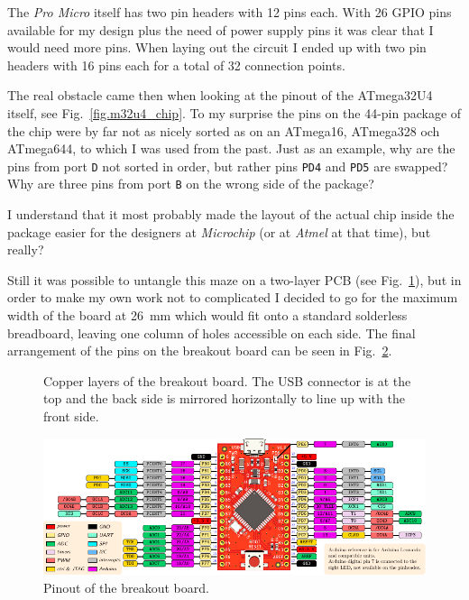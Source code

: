 \begin{multicols}{2}
The \emph{Pro Micro} itself has two pin headers with 12 pins each. With 26 GPIO pins available
for my design plus the need of power supply pins it was clear that I would need more pins.
When laying out the circuit I ended up with two pin headers with 16 pins each for a total
of 32 connection points.

The real obstacle came then when looking at the pinout of the ATmega32U4 itself, see Fig.~\ref{fig.m32u4_chip}.
To my surprise
the pins on the 44-pin package of the chip were by far not as nicely sorted as
on an ATmega16, ATmega328 och ATmega644, to which I was used from the past. Just as an example,
why are the pins from port \lstinline!D! not sorted in order, but rather pins \lstinline!PD4! and \lstinline!PD5!
 are swapped? Why are
three pins from port \lstinline!B! on the wrong side of the package?

I understand that it most probably made the layout of the actual chip inside the package easier
for the designers at \emph{Microchip} (or at \emph{Atmel} at that time), but really?

Still it was possible to untangle this maze on a two-layer PCB (see Fig.~\ref{fig.m32u4_board}), but in order to make my own work
not to complicated I decided to go for the maximum width of the board at \SI{26}{\milli\metre} which would fit onto a
standard solderless breadboard, leaving one column of holes accessible on each side. The final arrangement of the pins on the
breakout board can be seen in Fig.~\ref{fig.m32u4_pinout}.

\begin{figure}[H]
  \centering
  \caption{Copper layers of the breakout board. The USB connector is at the top and the back side is mirrored horizontally to line up with the front side.}\label{fig.m32u4_board}
\end{figure}

\begin{figure}
  \centering
  \includegraphics[width=\textwidth]{20230210_eduino_pinout}
  \caption{Pinout of the breakout board.}\label{fig.m32u4_pinout}
\end{figure}


\end{multicols}
